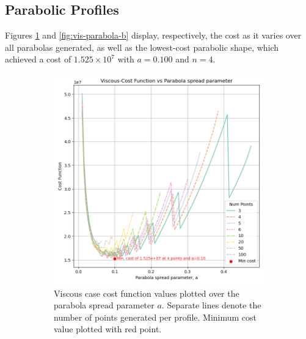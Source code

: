 \documentclass[11pt]{article}
\begin{document}
\subsection{Parabolic Profiles}
 Figures \ref{fig:vis-parabola-a} and \ref{fig:vis-parabola-b} display, respectively, the cost as it varies over all parabolas generated, as well as the lowest-cost parabolic shape, which achieved a cost of $1.525 \times 10^7$ with $a=0.100$ and $n=4$.
\begin{figure}[H]
\centering
\begin{subfigure}[b]{0.45\textwidth}
    \centering
    \includegraphics[width=\linewidth]{../results/viscous/parabolas.png}
    \caption{Viscous case cost function values plotted over the parabola spread parameter $a$. Separate lines denote the number of points generated per profile. Minimum cost value plotted with red point.}
    \label{fig:vis-parabola-a}
\end{subfigure}
\hfill
\begin{subfigure}[b]{0.45\textwidth}
    \centering

\end{subfigure}
\end{figure}
\end{document}
